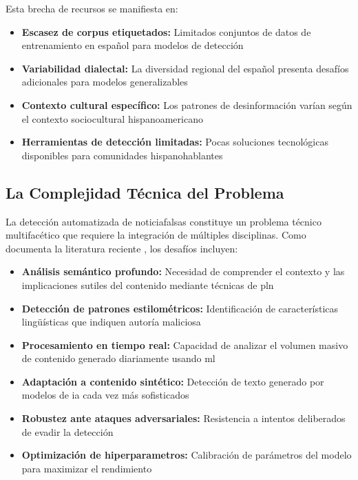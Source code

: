 Esta brecha de recursos se manifiesta en:
\begin{itemize}
    \item \textbf{Escasez de corpus etiquetados:} Limitados conjuntos de datos de entrenamiento en español para modelos de detección
    \item \textbf{Variabilidad dialectal:} La diversidad regional del español presenta desafíos adicionales para modelos generalizables
    \item \textbf{Contexto cultural específico:} Los patrones de desinformación varían según el contexto sociocultural hispanoamericano
    \item \textbf{Herramientas de detección limitadas:} Pocas soluciones tecnológicas disponibles para comunidades hispanohablantes
\end{itemize}

\subsection{La Complejidad Técnica del Problema}

La detección automatizada de \glspl{noticiafalsa} constituye un problema técnico multifacético que requiere la integración de múltiples disciplinas. Como documenta la literatura reciente \cite{singh2023comprehensive}, los desafíos incluyen:

\begin{itemize}
    \item \textbf{Análisis semántico profundo:} Necesidad de comprender el contexto y las implicaciones sutiles del contenido mediante técnicas de \gls{pln}
    \item \textbf{Detección de patrones estilométricos:} Identificación de características lingüísticas que indiquen autoría maliciosa \cite{tsai2023stylometric}
    \item \textbf{Procesamiento en tiempo real:} Capacidad de analizar el volumen masivo de contenido generado diariamente usando \gls{ml}
    \item \textbf{Adaptación a contenido sintético:} Detección de texto generado por modelos de \gls{ia} cada vez más sofisticados \cite{su2023adapting}
    \item \textbf{Robustez ante ataques adversariales:} Resistencia a intentos deliberados de evadir la detección
    \item \textbf{Optimización de \glspl{hiperparametro}:} Calibración de parámetros del modelo para maximizar el rendimiento
\end{itemize}

